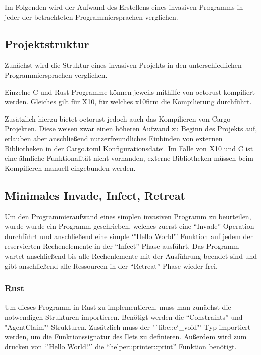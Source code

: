 Im Folgenden wird der Aufwand des Erstellens eines invasiven Programms in jeder der betrachteten
Programmiersprachen verglichen.

\subsection{Projektstruktur}

Zunächst wird die Struktur eines invasiven Projekts in den unterschiedlichen Programmiersprachen verglichen.

Einzelne C und Rust Programme können jeweils mithilfe von octorust kompiliert werden. Gleiches gilt für X10, für
welches x10firm die Kompilierung durchführt.

Zusätzlich hierzu bietet octorust jedoch auch das Kompilieren von Cargo Projekten. Diese weisen zwar einen
höheren Aufwand zu Beginn des Projekts auf, erlauben aber anschließend nutzerfreundliches Einbinden von
externen Bibliotheken in der Cargo.toml Konfigurationsdatei. Im Falle von X10 und C ist eine ähnliche
Funktionalität nicht vorhanden, externe Bibliotheken müssen beim Kompilieren manuell eingebunden werden.

\subsection{Minimales Invade, Infect, Retreat}

Um den Programmieraufwand eines simplen invasiven Programm zu beurteilen, wurde wurde ein Programm geschrieben, 
welches zuerst eine "`Invade"'-Operation durchführt und anschließend eine simple `"Hello World"'
Funktion auf jedem der reservierten Rechenelemente in der "`Infect"'-Phase ausführt.
Das Programm wartet anschließend bis alle Rechenlemente mit der Ausführung beendet sind und gibt anschließend
alle Ressourcen in der "`Retreat"'-Phase wieder frei.

\subsubsection{Rust}

Um dieses Programm in Rust zu implementieren, muss man zunächst die notwendigen Strukturen importieren.
Benötigt werden die "`Constraints"' und "AgentClaim"' Strukturen. 
Zusätzlich muss der "`libc::c\char`_void"'-Typ importiert werden, um die Funktionssignatur des Ilets zu definieren.
Außerdem wird zum drucken von `"Hello World!"' die "`helper::printer::print"' Funktion benötigt.

